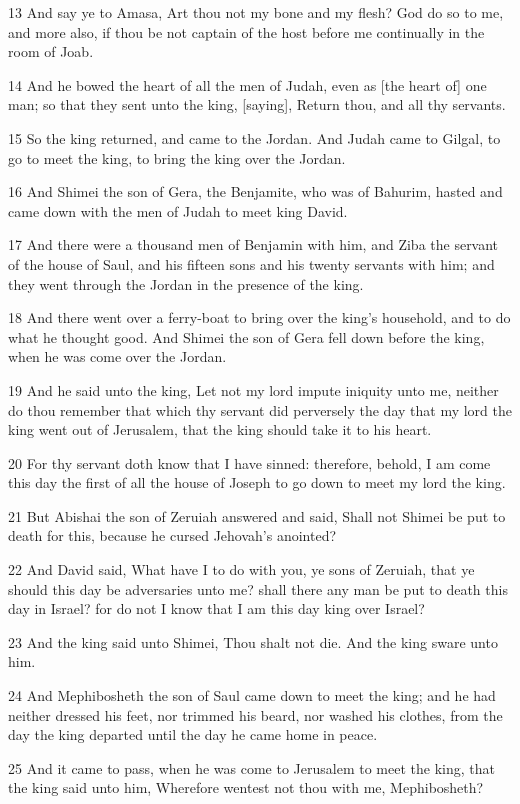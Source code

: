\par 13 And say ye to Amasa, Art thou not my bone and my flesh? God do so to me, and more also, if thou be not captain of the host before me continually in the room of Joab.
\par 14 And he bowed the heart of all the men of Judah, even as [the heart of] one man; so that they sent unto the king, [saying], Return thou, and all thy servants.
\par 15 So the king returned, and came to the Jordan. And Judah came to Gilgal, to go to meet the king, to bring the king over the Jordan.
\par 16 And Shimei the son of Gera, the Benjamite, who was of Bahurim, hasted and came down with the men of Judah to meet king David.
\par 17 And there were a thousand men of Benjamin with him, and Ziba the servant of the house of Saul, and his fifteen sons and his twenty servants with him; and they went through the Jordan in the presence of the king.
\par 18 And there went over a ferry-boat to bring over the king's household, and to do what he thought good. And Shimei the son of Gera fell down before the king, when he was come over the Jordan.
\par 19 And he said unto the king, Let not my lord impute iniquity unto me, neither do thou remember that which thy servant did perversely the day that my lord the king went out of Jerusalem, that the king should take it to his heart.
\par 20 For thy servant doth know that I have sinned: therefore, behold, I am come this day the first of all the house of Joseph to go down to meet my lord the king.
\par 21 But Abishai the son of Zeruiah answered and said, Shall not Shimei be put to death for this, because he cursed Jehovah's anointed?
\par 22 And David said, What have I to do with you, ye sons of Zeruiah, that ye should this day be adversaries unto me? shall there any man be put to death this day in Israel? for do not I know that I am this day king over Israel?
\par 23 And the king said unto Shimei, Thou shalt not die. And the king sware unto him.
\par 24 And Mephibosheth the son of Saul came down to meet the king; and he had neither dressed his feet, nor trimmed his beard, nor washed his clothes, from the day the king departed until the day he came home in peace.
\par 25 And it came to pass, when he was come to Jerusalem to meet the king, that the king said unto him, Wherefore wentest not thou with me, Mephibosheth?
